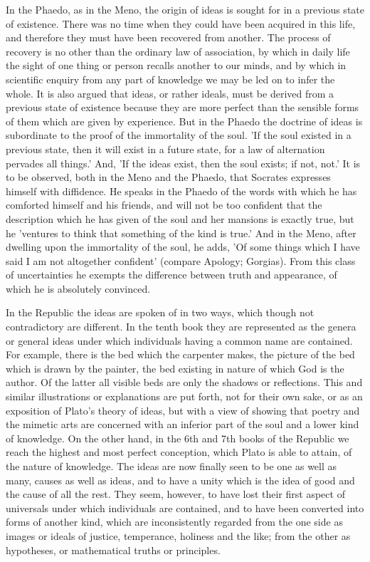 \documentclass[11pt,letter]{article}
\begin{document}
\par  In the Phaedo, as in the Meno, the origin of ideas is sought for in a previous state of existence. There was no time when they could have been acquired in this life, and therefore they must have been recovered from another. The process of recovery is no other than the ordinary law of association, by which in daily life the sight of one thing or person recalls another to our minds, and by which in scientific enquiry from any part of knowledge we may be led on to infer the whole. It is also argued that ideas, or rather ideals, must be derived from a previous state of existence because they are more perfect than the sensible forms of them which are given by experience. But in the Phaedo the doctrine of ideas is subordinate to the proof of the immortality of the soul. 'If the soul existed in a previous state, then it will exist in a future state, for a law of alternation pervades all things.' And, 'If the ideas exist, then the soul exists; if not, not.' It is to be observed, both in the Meno and the Phaedo, that Socrates expresses himself with diffidence. He speaks in the Phaedo of the words with which he has comforted himself and his friends, and will not be too confident that the description which he has given of the soul and her mansions is exactly true, but he 'ventures to think that something of the kind is true.' And in the Meno, after dwelling upon the immortality of the soul, he adds, 'Of some things which I have said I am not altogether confident' (compare Apology; Gorgias). From this class of uncertainties he exempts the difference between truth and appearance, of which he is absolutely convinced.

\par  In the Republic the ideas are spoken of in two ways, which though not contradictory are different. In the tenth book they are represented as the genera or general ideas under which individuals having a common name are contained. For example, there is the bed which the carpenter makes, the picture of the bed which is drawn by the painter, the bed existing in nature of which God is the author. Of the latter all visible beds are only the shadows or reflections. This and similar illustrations or explanations are put forth, not for their own sake, or as an exposition of Plato's theory of ideas, but with a view of showing that poetry and the mimetic arts are concerned with an inferior part of the soul and a lower kind of knowledge. On the other hand, in the 6th and 7th books of the Republic we reach the highest and most perfect conception, which Plato is able to attain, of the nature of knowledge. The ideas are now finally seen to be one as well as many, causes as well as ideas, and to have a unity which is the idea of good and the cause of all the rest. They seem, however, to have lost their first aspect of universals under which individuals are contained, and to have been converted into forms of another kind, which are inconsistently regarded from the one side as images or ideals of justice, temperance, holiness and the like; from the other as hypotheses, or mathematical truths or principles.
\end{document}
